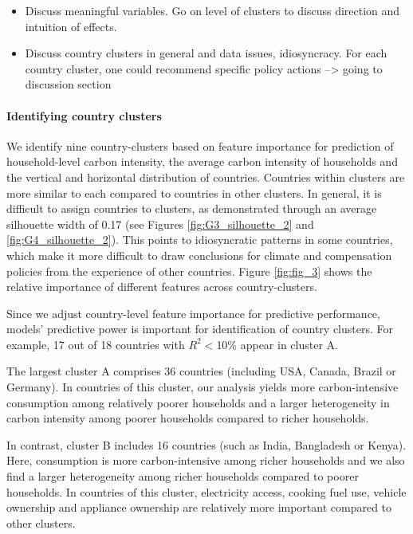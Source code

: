 \documentclass[12pt, a4paper]{article}
\begin{document}

\begin{itemize}
    \item Discuss meaningful variables. Go on level of clusters to discuss direction and intuition of effects.
    \item Discuss country clusters in general and data issues, idiosyncracy. For each country cluster, one could recommend specific policy actions --> going to discussion section
\end{itemize}

\paragraph{Identifying country clusters}

We identify nine country-clusters based on feature importance for prediction of household-level carbon intensity, the average carbon intensity of households and the vertical and horizontal distribution of countries. Countries within clusters are more similar to each compared to countries in other clusters. In general, it is difficult to assign countries to clusters, as demonstrated through an average silhouette width of 0.17 (see Figures \ref{fig:G3_silhouette_2} and \ref{fig:G4_silhouette_2}). This points to idiosyncratic patterns in some countries, which make it more difficult to draw conclusions for climate and compensation policies from the experience of other countries. Figure \ref{fig:fig_3} shows the relative importance of different features across country-clusters.

Since we adjust country-level feature importance for predictive performance, models' predictive power is important for identification of country clusters. For example, 17 out of 18 countries with $R^{2}<$10\% appear in cluster A.

The largest cluster A comprises 36 countries (including USA, Canada, Brazil or Germany). In countries of this cluster, our analysis yields more carbon-intensive consumption among relatively poorer households and a larger heterogeneity in carbon intensity among poorer households compared to richer households. 

In contrast, cluster B includes 16 countries (such as India, Bangladesh or Kenya). Here, consumption is more carbon-intensive among richer households and we also find a larger heterogeneity among richer households compared to poorer households. In countries of this cluster, electricity access, cooking fuel use, vehicle ownership and appliance ownership are relatively more important compared to other clusters.
\end{document}
